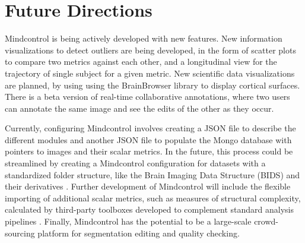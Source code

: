 \section{Future Directions}

Mindcontrol is being actively developed with new features. New information visualizations to detect outliers are being developed, in the form of scatter plots to compare two metrics against each other, and a longitudinal view for the trajectory of single subject for a given metric. New scientific data visualizations are planned, by using using the BrainBrowser library \cite{Sherif_2015} to display cortical surfaces. There is a beta version of real-time collaborative annotations, where two users can annotate the same image and see the edits of the other as they occur. 

Currently, configuring Mindcontrol involves creating a JSON file to describe the different modules and another JSON file to populate the Mongo database with pointers to images and their scalar metrics. In the future, this process could be streamlined by creating a Mindcontrol configuration for datasets with a standardized folder structure, like the Brain Imaging Data Structure (BIDS) \cite{Gorgolewski_2016} and their derivatives \cite{gorgolewski2016bids}. Further development of Mindcontrol will include the flexible importing of additional scalar metrics, such as measures of structural complexity, calculated by third-party toolboxes developed to complement standard analysis pipelines \cite{madan2016,madan2017}. Finally, Mindcontrol has the potential to be a large-scale crowd-sourcing platform for segmentation editing and quality checking.